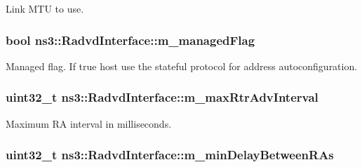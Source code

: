 Link M\+TU to use. 

\subsubsection[{\texorpdfstring{m\+\_\+managed\+Flag}{m_managedFlag}}]{\setlength{\rightskip}{0pt plus 5cm}bool ns3\+::\+Radvd\+Interface\+::m\+\_\+managed\+Flag\hspace{0.3cm}{\ttfamily [private]}}\hypertarget{classns3_1_1RadvdInterface_a963e57a2f2a860c82e9ecab0c9f273ec}{}\label{classns3_1_1RadvdInterface_a963e57a2f2a860c82e9ecab0c9f273ec}


Managed flag. If true host use the stateful protocol for address autoconfiguration. 

\subsubsection[{\texorpdfstring{m\+\_\+max\+Rtr\+Adv\+Interval}{m_maxRtrAdvInterval}}]{\setlength{\rightskip}{0pt plus 5cm}uint32\+\_\+t ns3\+::\+Radvd\+Interface\+::m\+\_\+max\+Rtr\+Adv\+Interval\hspace{0.3cm}{\ttfamily [private]}}\hypertarget{classns3_1_1RadvdInterface_a53bc442035e24d25f34f8c0a8cd20db6}{}\label{classns3_1_1RadvdInterface_a53bc442035e24d25f34f8c0a8cd20db6}


Maximum RA interval in milliseconds. 

\subsubsection[{\texorpdfstring{m\+\_\+min\+Delay\+Between\+R\+As}{m_minDelayBetweenRAs}}]{\setlength{\rightskip}{0pt plus 5cm}uint32\+\_\+t ns3\+::\+Radvd\+Interface\+::m\+\_\+min\+Delay\+Between\+R\+As\hspace{0.3cm}{\ttfamily [private]}}\hypertarget{classns3_1_1RadvdInterface_ad4a9e81800501a6d88444c7ca207a9f3}{}\label{classns3_1_1RadvdInterface_ad4a9e81800501a6d88444c7ca207a9f3}


